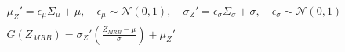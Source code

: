 ﻿\documentclass{article}
\begin{document}
\begin{preview}
\(\displaystyle
\begin{gathered}
  \mu_Z' = \epsilon_{\mu}\Sigma_{\mu}+\mu, \quad
  \epsilon_{\mu}\sim\mathcal{N}(0,1),\quad
  \sigma_Z' = \epsilon_{\sigma}\Sigma_{\sigma}+\sigma, \quad
  \epsilon_{\sigma}\sim\mathcal{N}(0,1) \\
  G(Z_{MRB})
  = \sigma_Z'\left(\frac{Z_{MRB}-\mu}{\sigma}\right)+\mu_Z' 
\end{gathered}
\)
\end{preview}
\end{document}
